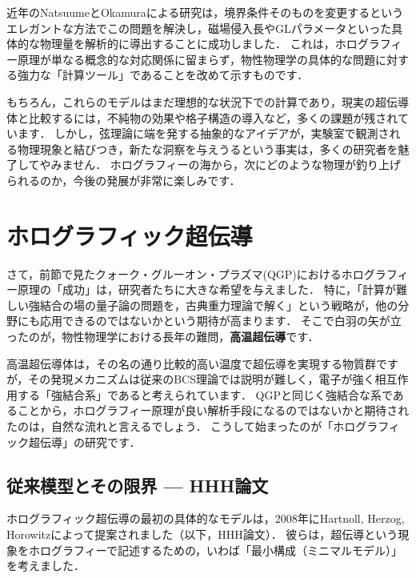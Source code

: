 \documentclass[b5paper,11pt,dvipdfmx]{jsarticle}
\numberwithin{equation}{section}
\theoremstyle{definition}
\begin{document}
近年のNatsuumeとOkamuraによる研究は，境界条件そのものを変更するというエレガントな方法でこの問題を解決し，磁場侵入長やGLパラメータといった具体的な物理量を解析的に導出することに成功しました．
これは，ホログラフィー原理が単なる概念的な対応関係に留まらず，物性物理学の具体的な問題に対する強力な「計算ツール」であることを改めて示すものです．

もちろん，これらのモデルはまだ理想的な状況下での計算であり，現実の超伝導体と比較するには，不純物の効果や格子構造の導入など，多くの課題が残されています．
しかし，弦理論に端を発する抽象的なアイデアが，実験室で観測される物理現象と結びつき，新たな洞察を与えうるという事実は，多くの研究者を魅了してやみません．
ホログラフィーの海から，次にどのような物理が釣り上げられるのか，今後の発展が非常に楽しみです．








\clearpage

\section{ホログラフィック超伝導}

さて，前節で見たクォーク・グルーオン・プラズマ(QGP)におけるホログラフィー原理の「成功」は，研究者たちに大きな希望を与えました．
特に，「計算が難しい強結合の場の量子論の問題を，古典重力理論で解く」という戦略が，他の分野にも応用できるのではないかという期待が高まります．
そこで白羽の矢が立ったのが，物性物理学における長年の難問，\textbf{高温超伝導}です．

高温超伝導体は，その名の通り比較的高い温度で超伝導を実現する物質群ですが，その発現メカニズムは従来のBCS理論では説明が難しく，電子が強く相互作用する「強結合系」であると考えられています．
QGPと同じく強結合な系であることから，ホログラフィー原理が良い解析手段になるのではないかと期待されたのは，自然な流れと言えるでしょう．
こうして始まったのが「ホログラフィック超伝導」の研究です．

\subsection{従来模型とその限界 --- HHH論文}

ホログラフィック超伝導の最初の具体的なモデルは，2008年にHartnoll, Herzog, Horowitzによって提案されました\cite{Hartnoll08a, Hartnoll08b}（以下，HHH論文）．
彼らは，超伝導という現象をホログラフィーで記述するための，いわば「最小構成（ミニマルモデル）」を考えました．
\end{document}
